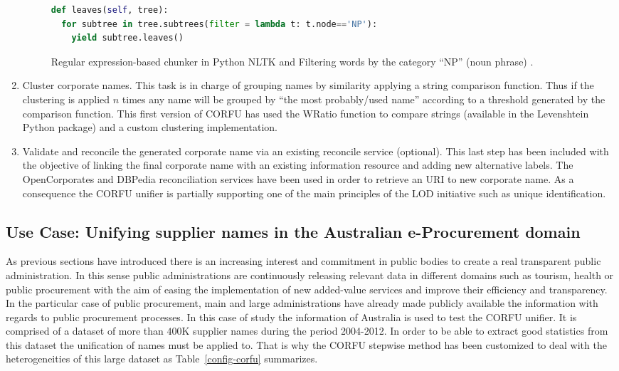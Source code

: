 \documentclass{llncs}
\begin{document}
\begin{enumerate}
\begin{figure}[!h]
\begin{center}
\begin{lstlisting}[language=Python]
def leaves(self, tree):
  for subtree in tree.subtrees(filter = lambda t: t.node=='NP'):
    yield subtree.leaves()
\end{lstlisting}
\caption{Regular expression-based chunker in Python NLTK and Filtering words by the category ``NP'' (noun phrase) .}
\label{figure:step-4}
\end{center}
\end{figure}   

\item Cluster corporate names. This task is in charge of grouping names by similarity applying 
a string comparison function. Thus if the clustering is applied $n$ times any name 
will be grouped by ``the most probably/used name'' according to a threshold generated 
by the comparison function. This first version of CORFU has used the WRatio function to 
compare strings (available in the Levenshtein Python package) and a custom clustering 
implementation.

\item Validate and reconcile the generated corporate name via an existing reconcile service (optional). This last 
step has been included with the objective of linking the final corporate name with an existing information 
resource and adding new alternative labels. The OpenCorporates and DBPedia reconciliation services have 
been used in order to retrieve an URI to new corporate name. As a consequence the CORFU unifier is partially supporting 
one of the main principles of the LOD initiative such as unique identification.
\end{enumerate}
% 
%
\subsection{Use Case: Unifying supplier names in the Australian e-Procurement domain}
As previous sections have introduced there is an increasing interest and commitment 
in public bodies to create a real transparent public administration. In this sense 
public administrations are continuously releasing relevant data in different domains 
such as tourism, health or public procurement with the aim of easing the implementation 
of new added-value services and improve their efficiency and transparency. In the particular 
case of public procurement, main and large administrations have already made publicly available the information 
with regards to public procurement processes. In this case of study the information of Australia is used 
to test the CORFU unifier. It is comprised of a dataset of more than $400$K supplier names during the period 2004-2012. In order to be able to extract 
good statistics from this dataset the unification of names must be applied to. That is why 
the CORFU stepwise method has been customized to deal with the heterogeneities of this large 
dataset as Table~\ref{config-corfu} summarizes.
\end{document}
